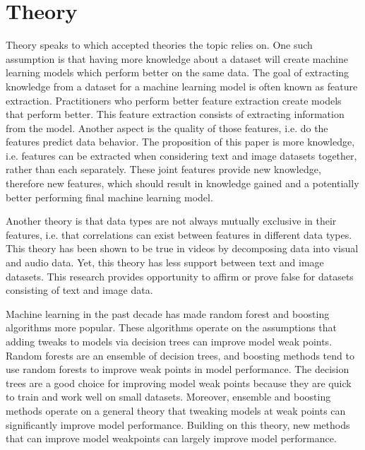 \chapter{Theory} %

Theory speaks to which accepted theories the topic relies on.  One such assumption is that having more knowledge about a dataset will create machine learning models which perform better on the same data.  The goal of extracting knowledge from a dataset for a machine learning model is often known as feature extraction.  Practitioners who perform better feature extraction create models that perform better.  This feature extraction consists of extracting information from the model.  Another aspect is the quality of those features, i.e. do the features predict data behavior.  The proposition of this paper is more knowledge, i.e. features can be extracted when considering text and image datasets together, rather than each separately.  These joint features provide new knowledge, therefore new features, which should result in knowledge gained and a potentially better performing final machine learning model.  

Another theory is that data types are not always mutually exclusive in their features, i.e. that correlations can exist between features in different data types.  This theory has been shown to be true in videos by decomposing data into visual and audio data.  Yet, this theory has less support between text and image datasets.  This research provides opportunity to affirm or prove false for datasets consisting of text and image data.  

Machine learning in the past decade has made random forest and boosting algorithms more popular.  These algorithms operate on the assumptions that adding tweaks to models via decision trees can improve model weak points.  Random forests are an ensemble of decision trees, and boosting methods tend to use random forests to improve weak points in model performance.  The decision trees are a good choice for improving model weak points because they are quick to train and work well on small datasets.  Moreover, ensemble and boosting methods operate on a general theory that tweaking models at weak points can significantly improve model performance.  Building on this theory, new methods that can improve model weakpoints can largely improve model performance.  


